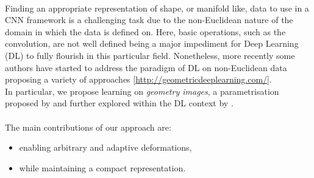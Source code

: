\\
Finding an appropriate representation of shape, or manifold like, data to use in a CNN framework is a challenging task due to the non-Euclidean nature of the domain in which the data is defined on. Here, basic operations, such as the convolution, are not well defined being a major impediment for Deep Learning (DL) to fully flourish in this particular field. Nonetheless, more recently some authors have started to address the paradigm of DL on non-Euclidean data proposing a variety of approaches \cite{Masci2015ShapeNetCN, Geometric_deep_learning, CNN_on_Torus} [\url{http://geometricdeeplearning.com/}]. \\
In particular, we propose learning on \textit{geometry images}, a parametrisation proposed by \citep{gu2002geometry} and further explored within the DL context by \cite{Sinha2016DeepL3}.   
\\
\\
The main contributions of our approach are: 
\begin{itemize}
\item enabling arbitrary and adaptive deformations,
\item while maintaining a compact representation. 
\end{itemize}

